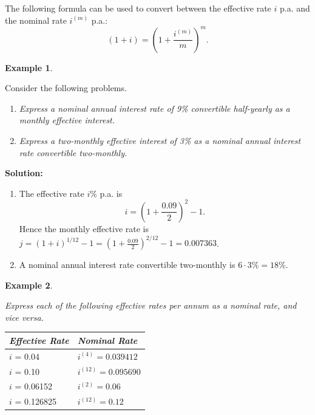 \documentclass[landscape, 20pt]{extreport}
\theoremstyle{definition}
\theoremstyle{definition}
\newtheorem{example}{Example}[chapter]
\theoremstyle{definition}
\theoremstyle{definition}
\theoremstyle{remark}
\begin{document}
The following formula can be used to convert between the effective rate
\(i\) p.a. and the nominal rate \(i^{(m)}\) p.a.:
\[( 1 + i) = \left( 1 + \frac{i^{(m)}}{m}\right)^m.\]

\newpage \begin{example}
\protect\hypertarget{exm:unlabeled-div-13}{}\label{exm:unlabeled-div-13}

Consider the following problems.

\begin{enumerate}
\def\labelenumi{\arabic{enumi}.}
\item
  \emph{Express a nominal annual interest rate of 9\% convertible
  half-yearly as a monthly effective interest.}
\item
  \emph{Express a two-monthly effective interest of 3\% as a nominal annual
  interest rate convertible two-monthly.}
\end{enumerate}

\end{example}

\textbf{Solution:}

\begin{enumerate}
\def\labelenumi{\arabic{enumi}.}
\item
  The effective rate \(i\)\% p.a. is \[i = ( 1 + \frac{0.09}{2})^2 - 1.\]
  Hence the monthly effective rate is
  \(j = (1 + i)^{1/12} - 1 = ( 1 + \frac{0.09}{2})^{2/12} - 1 = 0.007363\).
\item
  A nominal annual interest rate convertible two-monthly is
  \(6 \cdot 3\% = 18\%\).
\end{enumerate}

\newpage \begin{example}
\protect\hypertarget{exm:unlabeled-div-14}{}\label{exm:unlabeled-div-14}

\emph{Express each of the following effective rates per annum as a nominal
rate, and vice versa.}

\begin{longtable}[]{@{}ll@{}}
\toprule
\textbf{\emph{Effective Rate}} & \textbf{\emph{Nominal Rate}} \\
\midrule
\endhead
\(i\) = 0.04 & \(i^{(4)} = 0.039412\) \\
\(i\) = 0.10 & \(i^{(12)} = 0.095690\) \\
\(i\) = 0.06152 & \(i^{(2)} = 0.06\) \\
\(i\) = 0.126825 & \(i^{(12)} = 0.12\) \\
\bottomrule
\end{longtable}

\end{example}
\end{document}
